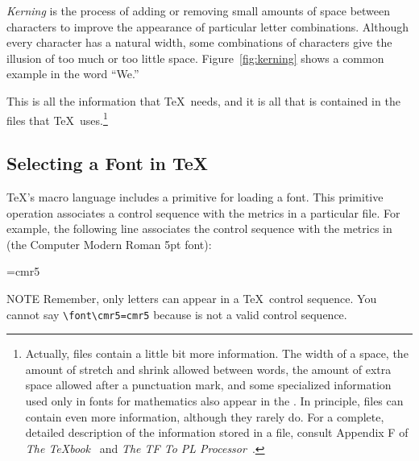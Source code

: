 
{\em Kerning\/} is the process of 
adding or removing small amounts of space
between characters
to improve the appearance of particular letter combinations.   Although every
character has a natural width, some combinations of characters give the
illusion of too much or too little space.  Figure~\ref{fig:kerning}
shows a common example in the word ``We.''  


This is all the information that \TeX\ needs, and it is all that is contained
in the  files that \TeX\ uses.\footnote{Actually,  files
contain a little bit more information.  The width of a space, the amount of
stretch and shrink allowed between words, the amount of extra space allowed
after a punctuation mark, and some specialized information used only in fonts
for mathematics also appear in the .  In 
principle, 
files can contain even more information, although they rarely do.  For a
complete, detailed description of the information stored in a  file,
consult Appendix F of {\it The \TeX{}book}~\cite{kn:texbook} and \textit{The
TF To PL Processor}~\cite{texware:tftopl}.}

\subsection{Selecting a Font in \protect\TeX}

\TeX's macro language includes a  primitive for
loading a 
font.  This primitive operation 
associates a control sequence
with the metrics in a particular  file.  For example, the
following line associates the control sequence  with
the metrics in  (the Computer Modern Roman 5pt font):

\begin{shortexample}
\font\tinyfont=cmr5
\end{shortexample}

\begin{note}{NOTE}
  Remember, only letters can appear in a \TeX\ control sequence.  You
  cannot say \verb|\font\cmr5=cmr5| because  is not
  a valid control sequence.
\end{note}

